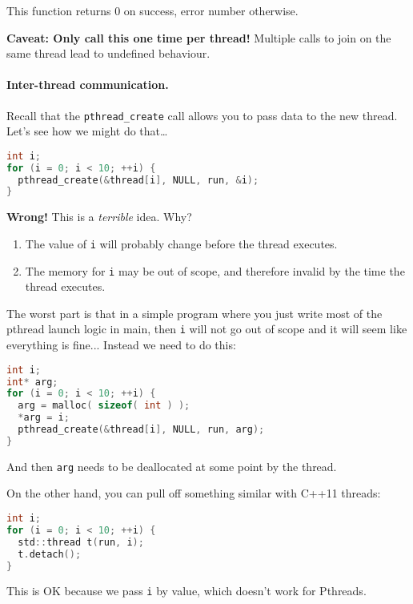 This function returns 0 on success, error number otherwise.

 {\bf Caveat: Only call this one time per thread!} Multiple calls to join on the same thread
  lead to undefined behaviour.

\paragraph{Inter-thread communication.} Recall that the {\tt pthread\_create} 
call allows you to pass data to the new thread. Let's see how we might do that\ldots

\begin{lstlisting}[language=C]
int i;
for (i = 0; i < 10; ++i) {
  pthread_create(&thread[i], NULL, run, &i);
}
\end{lstlisting}

{\bf Wrong!} This is a \emph{terrible} idea. Why?
\begin{enumerate}
    \item The value of {\tt i} will probably change before the thread executes.
    \item The memory for {\tt i} may be out of scope, and therefore invalid by
          the time the thread executes.
\end{enumerate}
The worst part is that in a simple program where you just write most of the pthread launch logic in main, then \texttt{i} will not go out of scope and it will seem like everything is fine... Instead we need to do this:

\begin{lstlisting}[language=C]
int i;
int* arg;
for (i = 0; i < 10; ++i) {
  arg = malloc( sizeof( int ) );
  *arg = i;
  pthread_create(&thread[i], NULL, run, arg);
}
\end{lstlisting}

And then \texttt{arg} needs to be deallocated at some point by the thread.

On the other hand, you can pull off something similar with C++11 threads:
\begin{lstlisting}[language=C]
int i;
for (i = 0; i < 10; ++i) {
  std::thread t(run, i);
  t.detach();
}
\end{lstlisting}
This is OK because we pass {\tt i} by value, which doesn't work for Pthreads.

